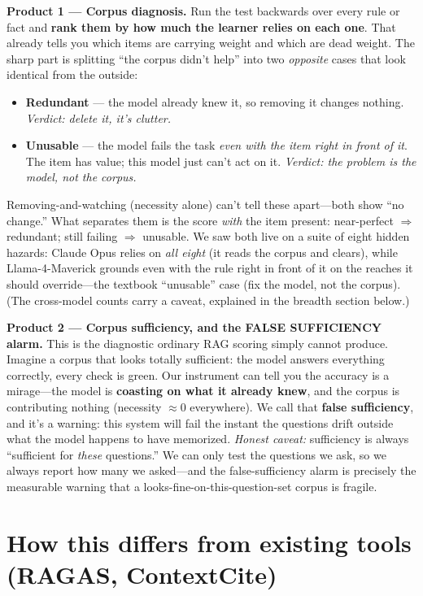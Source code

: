 \documentclass[11pt]{article}
\begin{document}
\textbf{Product 1 --- Corpus diagnosis.} Run the test backwards over every rule or fact and
\textbf{rank them by how much the learner relies on each one}. That already tells you which items
are carrying weight and which are dead weight. The sharp part is splitting ``the corpus didn't
help'' into two \emph{opposite} cases that look identical from the outside:
\begin{itemize}[leftmargin=1.4em]
  \item \textbf{Redundant} --- the model already knew it, so removing it changes nothing.
  \emph{Verdict: delete it, it's clutter.}
  \item \textbf{Unusable} --- the model fails the task \emph{even with the item right in front of
  it}. The item has value; this model just can't act on it. \emph{Verdict: the problem is the
  model, not the corpus.}
\end{itemize}
Removing-and-watching (necessity alone) can't tell these apart---both show ``no change.'' What
separates them is the score \emph{with} the item present: near-perfect $\Rightarrow$ redundant;
still failing $\Rightarrow$ unusable. We saw both live on a suite of eight hidden hazards: Claude
Opus relies on \emph{all eight} (it reads the corpus and clears), while Llama-4-Maverick grounds
even with the rule right in front of it on the reaches it should override---the textbook
``unusable'' case (fix the model, not the corpus). (The cross-model counts carry a caveat,
explained in the breadth section below.)

\textbf{Product 2 --- Corpus sufficiency, and the FALSE SUFFICIENCY alarm.} This is the
diagnostic ordinary RAG scoring simply cannot produce. Imagine a corpus that looks totally
sufficient: the model answers everything correctly, every check is green. Our instrument can tell
you the accuracy is a mirage---the model is \textbf{coasting on what it already knew}, and the
corpus is contributing nothing (necessity $\approx$0 everywhere). We call that \textbf{false
sufficiency}, and it's a warning: this system will fail the instant the questions drift outside
what the model happens to have memorized. \emph{Honest caveat:} sufficiency is always ``sufficient
for \emph{these} questions.'' We can only test the questions we ask, so we always report how many
we asked---and the false-sufficiency alarm is precisely the measurable warning that a
looks-fine-on-this-question-set corpus is fragile.

\section*{How this differs from existing tools (RAGAS, ContextCite)}
\end{document}
